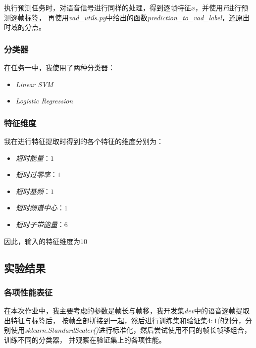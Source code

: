 \documentclass[a4paper]{article}
\begin{document}
执行预测任务时，对语音信号进行同样的处理，得到逐帧特征$x$，并使用$F$进行预测逐帧标签，
再使用\emph{vad\_utils.py}中给出的函数\emph{prediction\_to\_vad\_label}，还原出时域的分点。

\subsubsection{分类器}
在任务一中，我使用了两种分类器：
\begin{itemize}
  \item \emph{Linear SVM}
  \item \emph{Logistic Regression}
\end{itemize}

\subsubsection{特征维度}
我在进行特征提取时得到的各个特征的维度分别为：
  \begin{itemize}
    \item \emph{短时能量}：$1$
    \item \emph{短时过零率}：$1$
    \item \emph{短时基频}：$1$
    \item \emph{短时频谱中心}：$1$
    \item \emph{短时子带能量}：$6$
  \end{itemize}
  因此，输入的特征维度为$10$

\subsection{实验结果}
\subsubsection{各项性能表征}
在本次作业中，我主要考虑的参数是帧长与帧移，我开发集\emph{dev}中的语音逐帧提取出特征与标签后，
按帧全部拼接到一起，然后进行训练集和验证集$4: 1$的划分，分别使用\emph{sklearn.StandardScaler()}进行标准化，然后尝试使用不同的帧长帧移组合，训练不同的分类器，
并观察在验证集上的各项性能。
\end{document}
